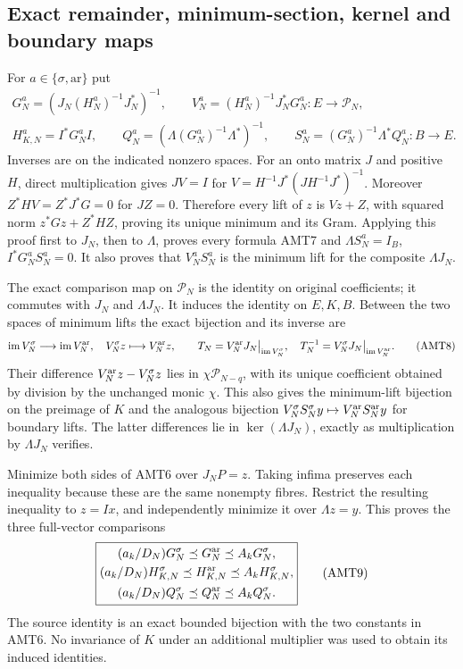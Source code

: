 \documentclass[11pt,a4paper]{article}
\begin{document}
\subsection{Exact remainder, minimum-section, kernel and boundary maps}
For $a\in\{\sigma,\mathrm{ar}\}$ put
\[
\begin{gathered}
 G_N^a=(J_N(H_N^a)^{-1}J_N^*)^{-1},\qquad
 V_N^a=(H_N^a)^{-1}J_N^*G_N^a:E\longrightarrow\mathcal P_N,\\
 H_{K,N}^a=I^*G_N^aI,\qquad
 Q_N^a=(\Lambda(G_N^a)^{-1}\Lambda^*)^{-1},\qquad
 S_N^a=(G_N^a)^{-1}\Lambda^*Q_N^a:B\longrightarrow E.
\end{gathered}\tag{AMT7}
\]
Inverses are on the indicated nonzero spaces. For an onto matrix
$J$ and positive $H$, direct multiplication gives $JV=I$ for
$V=H^{-1}J^*(JH^{-1}J^*)^{-1}$. Moreover
$Z^*HV=Z^*J^*G=0$ for $JZ=0$. Therefore every lift of $z$ is
$Vz+Z$, with squared norm
$z^*Gz+Z^*HZ$, proving its unique minimum and its Gram. Applying
this proof first to $J_N$, then to $\Lambda$, proves every formula
AMT7 and $\Lambda S_N^a=I_B$, $I^*G_N^aS_N^a=0$.
It also proves that $V_N^aS_N^a$ is the minimum lift for the
composite $\Lambda J_N$.

The exact comparison map on $\mathcal P_N$ is the identity on
original coefficients; it commutes with $J_N$ and $\Lambda J_N$.
It induces the identity on $E,K,B$. Between the two spaces of
minimum lifts the exact bijection and its inverse are
\[
 \operatorname{im}V_N^\sigma\longrightarrow\operatorname{im}V_N^{\rm ar},
 \quad V_N^\sigma z\longmapsto V_N^{\rm ar}z,
 \qquad T_N=V_N^{\rm ar}J_N\big|_{\operatorname{im}V_N^\sigma},
 \quad T_N^{-1}=V_N^\sigma J_N\big|_{\operatorname{im}V_N^{\rm ar}}.
 \tag{AMT8}
\]
Their difference $V_N^{\rm ar}z-V_N^\sigma z$ lies in
$\chi\mathcal P_{N-q}$, with its unique coefficient obtained by
division by the unchanged monic $\chi$. This also gives the
minimum-lift bijection on the preimage of $K$ and the analogous
bijection $V_N^\sigma S_N^\sigma y\mapsto
V_N^{\rm ar}S_N^{\rm ar}y$ for boundary lifts. The latter
differences lie in $\ker(\Lambda J_N)$, exactly as multiplication
by $\Lambda J_N$ verifies.

Minimize both sides of AMT6 over $J_NP=z$. Taking infima preserves
each inequality because these are the same nonempty fibres. Restrict
the resulting inequality to $z=Ix$, and independently minimize it
over $\Lambda z=y$. This proves the three full-vector comparisons
\[
\boxed{\begin{gathered}
 (a_k/D_N)G_N^\sigma\preceq G_N^{\rm ar}\preceq A_kG_N^\sigma,\\
 (a_k/D_N)H_{K,N}^\sigma\preceq H_{K,N}^{\rm ar}
                                      \preceq A_kH_{K,N}^\sigma,\\
 (a_k/D_N)Q_N^\sigma\preceq Q_N^{\rm ar}\preceq A_kQ_N^\sigma.
\end{gathered}}\tag{AMT9}
\]
The source identity is an exact bounded bijection with the two
constants in AMT6. No invariance of $K$ under an additional
multiplier was used to obtain its induced identities.
\end{document}
